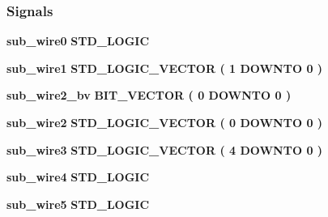 \subsubsection*{Signals}
 \begin{DoxyCompactItemize}
\item 
{\bf sub\+\_\+wire0} {\bfseries \textcolor{comment}{S\+T\+D\+\_\+\+L\+O\+G\+IC}\textcolor{vhdlchar}{ }} 
\item 
{\bf sub\+\_\+wire1} {\bfseries \textcolor{comment}{S\+T\+D\+\_\+\+L\+O\+G\+I\+C\+\_\+\+V\+E\+C\+T\+OR}\textcolor{vhdlchar}{ }\textcolor{vhdlchar}{(}\textcolor{vhdlchar}{ }\textcolor{vhdlchar}{ } \textcolor{vhdldigit}{1} \textcolor{vhdlchar}{ }\textcolor{keywordflow}{D\+O\+W\+N\+TO}\textcolor{vhdlchar}{ }\textcolor{vhdlchar}{ } \textcolor{vhdldigit}{0} \textcolor{vhdlchar}{ }\textcolor{vhdlchar}{)}\textcolor{vhdlchar}{ }} 
\item 
{\bf sub\+\_\+wire2\+\_\+bv} {\bfseries \textcolor{comment}{B\+I\+T\+\_\+\+V\+E\+C\+T\+OR}\textcolor{vhdlchar}{ }\textcolor{vhdlchar}{(}\textcolor{vhdlchar}{ }\textcolor{vhdlchar}{ } \textcolor{vhdldigit}{0} \textcolor{vhdlchar}{ }\textcolor{keywordflow}{D\+O\+W\+N\+TO}\textcolor{vhdlchar}{ }\textcolor{vhdlchar}{ } \textcolor{vhdldigit}{0} \textcolor{vhdlchar}{ }\textcolor{vhdlchar}{)}\textcolor{vhdlchar}{ }} 
\item 
{\bf sub\+\_\+wire2} {\bfseries \textcolor{comment}{S\+T\+D\+\_\+\+L\+O\+G\+I\+C\+\_\+\+V\+E\+C\+T\+OR}\textcolor{vhdlchar}{ }\textcolor{vhdlchar}{(}\textcolor{vhdlchar}{ }\textcolor{vhdlchar}{ } \textcolor{vhdldigit}{0} \textcolor{vhdlchar}{ }\textcolor{keywordflow}{D\+O\+W\+N\+TO}\textcolor{vhdlchar}{ }\textcolor{vhdlchar}{ } \textcolor{vhdldigit}{0} \textcolor{vhdlchar}{ }\textcolor{vhdlchar}{)}\textcolor{vhdlchar}{ }} 
\item 
{\bf sub\+\_\+wire3} {\bfseries \textcolor{comment}{S\+T\+D\+\_\+\+L\+O\+G\+I\+C\+\_\+\+V\+E\+C\+T\+OR}\textcolor{vhdlchar}{ }\textcolor{vhdlchar}{(}\textcolor{vhdlchar}{ }\textcolor{vhdlchar}{ } \textcolor{vhdldigit}{4} \textcolor{vhdlchar}{ }\textcolor{keywordflow}{D\+O\+W\+N\+TO}\textcolor{vhdlchar}{ }\textcolor{vhdlchar}{ } \textcolor{vhdldigit}{0} \textcolor{vhdlchar}{ }\textcolor{vhdlchar}{)}\textcolor{vhdlchar}{ }} 
\item 
{\bf sub\+\_\+wire4} {\bfseries \textcolor{comment}{S\+T\+D\+\_\+\+L\+O\+G\+IC}\textcolor{vhdlchar}{ }} 
\item 
{\bf sub\+\_\+wire5} {\bfseries \textcolor{comment}{S\+T\+D\+\_\+\+L\+O\+G\+IC}\textcolor{vhdlchar}{ }} 
\end{DoxyCompactItemize}
